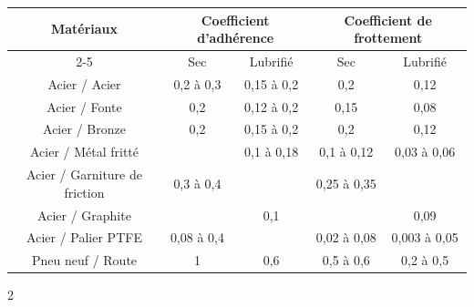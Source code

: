 \documentclass[10pt]{article}
\begin{document}
\begin{center}
\begin{tabular}{|c||c|c||c|c|}
\hline
\multirow{2}{*}{Matériaux} 
& \multicolumn{2}{c||}{Coefficient d'adhérence} & \multicolumn{2}{c|}{Coefficient de frottement} \\
\cline{2-5}
& Sec & Lubrifié & Sec & Lubrifié \\
\hline
\hline
Acier / Acier & 0,2 à 0,3 & 0,15 à 0,2 & 0,2 & 0,12 \\ \hline
Acier / Fonte & 0,2 & 0,12 à 0,2 & 0,15 & 0,08 \\ \hline
Acier / Bronze & 0,2 & 0,15 à 0,2 & 0,2 & 0,12 \\ \hline
Acier / Métal fritté &  & 0,1 à 0,18 & 0,1 à 0,12 & 0,03 à 0,06 \\ \hline
Acier / Garniture de friction & 0,3 à 0,4 &  & 0,25 à 0,35 &  \\ \hline
Acier / Graphite &  & 0,1 &  & 0,09 \\ \hline
Acier / Palier PTFE & 0,08 à 0,4 &  & 0,02 à 0,08 & 0,003 à 0,05 \\ \hline
Pneu neuf / Route & 1 & 0,6  & 0,5 à 0,6  & 0,2 à 0,5\\ \hline
\end{tabular}
\end{center}

\begin{thebibliography}{2}
\end{thebibliography}
\end{document}
